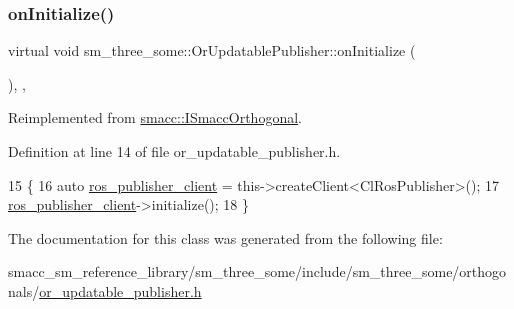 \subsubsection{\texorpdfstring{on\+Initialize()}{onInitialize()}}
{\footnotesize\ttfamily virtual void sm\+\_\+three\+\_\+some\+::\+Or\+Updatable\+Publisher\+::on\+Initialize (\begin{DoxyParamCaption}{ }\end{DoxyParamCaption})\hspace{0.3cm}{\ttfamily [inline]}, {\ttfamily [override]}, {\ttfamily [virtual]}}



Reimplemented from \hyperlink{classsmacc_1_1ISmaccOrthogonal_a6bb31c620cb64dd7b8417f8705c79c7a}{smacc\+::\+I\+Smacc\+Orthogonal}.



Definition at line 14 of file or\+\_\+updatable\+\_\+publisher.\+h.


\begin{DoxyCode}
15     \{
16         \textcolor{keyword}{auto} \hyperlink{namespaceros__publisher__client}{ros\_publisher\_client} = this->createClient<ClRosPublisher>();
17         \hyperlink{namespaceros__publisher__client}{ros\_publisher\_client}->initialize();
18     \}
\end{DoxyCode}


The documentation for this class was generated from the following file\+:\begin{DoxyCompactItemize}
\item 
smacc\+\_\+sm\+\_\+reference\+\_\+library/sm\+\_\+three\+\_\+some/include/sm\+\_\+three\+\_\+some/orthogonals/\hyperlink{sm__three__some_2include_2sm__three__some_2orthogonals_2or__updatable__publisher_8h}{or\+\_\+updatable\+\_\+publisher.\+h}\end{DoxyCompactItemize}
